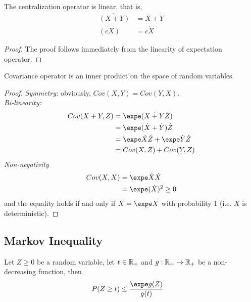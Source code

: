 \documentclass{article}
\begin{document}
   	\begin{proposition}
   		The centralization operator is linear, that is,
   		\begin{align}
   			\dot{(X + Y)} &= \dot{X} + \dot{Y} \\
   			\dot{(cX)} &= c \dot{X}
   		\end{align}
   	\end{proposition}
   	
   	\begin{proof}
   		The proof follows immediately from the linearity of expectation operator.
   	\end{proof}
   	
   	\begin{theorem}
   		Covariance operator is an inner product on the space of random variables.
   	\end{theorem}
   	
   	\begin{proof}
   		\emph{Symmetry:} obviously, $Cov(X, Y) = Cov(Y, X)$. \\
   		\emph{Bi-linearity:}
   		\begin{align}
   			Cov(X+Y, Z) &= \expe (\dot{X + Y} \dot{Z}) \\
   			&= \expe (\dot{X} + \dot{Y}) \dot{Z} \\
   			&= \expe \dot{X}\dot{Z} + \expe \dot{Y} \dot{Z} \\
   			&= Cov(X, Z) + Cov(Y, Z)
   		\end{align}
   		\emph{Non-negativity}
   		\begin{align}
   			Cov(X, X) &= \expe \dot{X} \dot{X} \\
   			&= \expe (\dot{X})^2 \geq 0
   		\end{align}
   		and the equality holds if and only if $X = \expe X$ with probability 1 (i.e. $X$ is deterministic).
   	\end{proof}
   	
   	\subsection{Markov Inequality}
   	\begin{theorem}
   		Let $Z \geq 0$ be a random variable, let $t \in \mathbb{R}_+$ and $g: \mathbb{R}_+ \to \mathbb{R}_+$ be a non-decreasing function, then
   		\begin{align}
   			P(Z \geq t) &\leq \frac{\expe g(Z)}{g(t)}
   		\end{align}
   	\end{theorem}
   	
\end{document}
